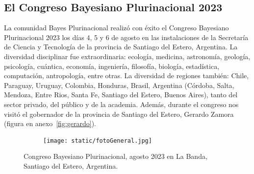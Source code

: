 \documentclass[a4paper,11pt]{book}
\theoremstyle{definition}
\begin{document}
\subsection{El Congreso Bayesiano Plurinacional 2023}

La comunidad Bayes Plurinacional realiz\'o con \'exito el Congreso Bayesiano Plurinacional 2023 los d\'ias 4, 5 y 6 de agosto en las instalaciones de la Secretar\'ia de Ciencia y Tecnolog\'ia de la provincia de Santiago del Estero, Argentina.
%
La diversidad disciplinar fue extraordinaria: ecolog\'ia, medicina, astronom\'ia, geolog\'ia, psicolog\'ia, cu\'antica, econom\'ia, ingenier\'ia, filosof\'ia, biolog\'ia, estad\'istica, computaci\'on, antropolog\'ia, entre otras.
%
La diversidad de regiones tambi\'en: Chile, Paraguay, Uruguay, Colombia, Honduras, Brasil, Argentina (C\'ordoba, Salta, Mendoza, Entre Rios, Santa Fe, Santiago del Estero, Buenos Aires), tanto del sector privado, del p\'ublico y de la academia.
%
Adem\'as, durante el congreso nos visit\'o el gobernador de la provincia de Santiago del Estero, Gerardo Zamora (figura en anexo~\ref{fig:gerardo}).


\begin{figure}[!ht]
\centering
  \begin{subfigure}[b]{1\textwidth}
  \texttt{[image: static/fotoGeneral.jpg]}
  \end{subfigure}
  \caption{Congreso Bayesiano Plurinacional, agosto 2023 en La Banda, Santiago del Estero, Argentina.}
\end{figure}


\end{document}
